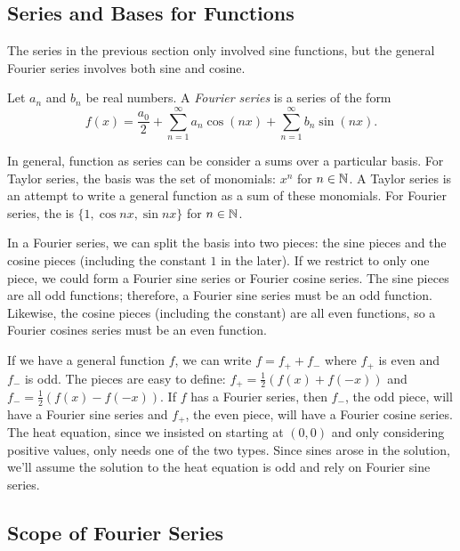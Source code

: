 \documentclass[fleqn,letterpaper]{report}
\begin{document}
\subsection{Series and Bases for Functions}
\label{bases}

The series in the previous section only involved sine
functions, but the general Fourier series involves both sine
and cosine.

\begin{defn}
Let $a_n$ and $b_n$ be real numbers. A \emph{Fourier series}
is a series of the form
\begin{equation*}
f(x) = \frac{a_0}{2} + \sum_{n=1}^\infty a_n \cos (nx) +
\sum_{n=1}^\infty b_n \sin (nx).
\end{equation*}
\end{defn}

In general, function as series can be consider a sums over a
particular basis. For Taylor series, the basis was the set of
monomials: $x^n$ for $n \in \mathbb{N}$. A Taylor series is an
attempt to write a general function as a sum of these
monomials.  For Fourier series, the is $\{ 1, \cos nx, \sin nx
\}$ for $n \in \mathbb{N}$. 

In a Fourier series, we can split the basis into two pieces:
the sine pieces and the cosine pieces (including the constant
$1$ in the later). If we restrict to only one piece, we could
form a Fourier sine series or Fourier cosine series. The sine
pieces are all odd functions; therefore, a Fourier sine series
must be an odd function. Likewise, the cosine pieces
(including the constant) are all even functions, so a Fourier
cosines series must be an even function. 

If we have a general function $f$, we can write $f = f_+ +
f_-$ where $f_+$ is even and $f_-$ is odd. The pieces are easy
to define: $f_+ = \frac{1}{2} (f(x) + f(-x))$ and $f_- =
\frac{1}{2} (f(x) - f(-x))$. If $f$ has a Fourier series, then
$f_-$, the odd piece, will have a Fourier sine series and
$f_+$, the even piece, will have a Fourier cosine series. The
heat equation, since we insisted on starting at $(0,0)$ and
only considering positive values, only needs one of the two
types. Since sines arose in the solution, we'll assume the
solution to the heat equation is odd and rely on Fourier sine
series.

\subsection{Scope of Fourier Series}
\label{fourier-scope}
\end{document}
